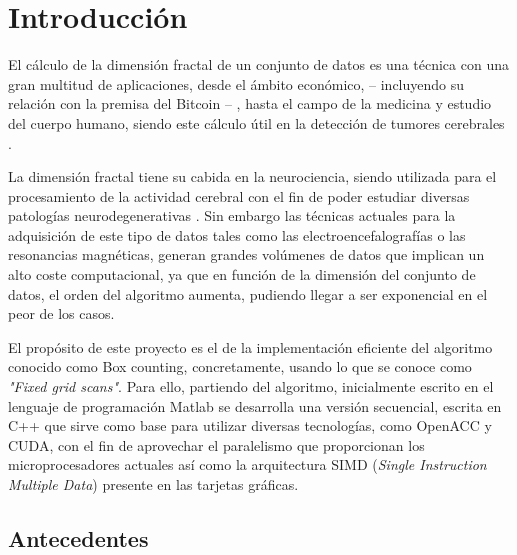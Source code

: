 \chapter{Introducción}


El cálculo de la dimensión fractal de un conjunto de datos es una técnica con una gran multitud de aplicaciones, desde el ámbito económico, -- incluyendo su relación con la premisa del Bitcoin --  {\cite{delfin2016fractal}}, hasta el campo de la medicina y estudio del cuerpo humano, siendo este cálculo útil en la detección de tumores cerebrales {\cite{iftekharuddin2009fractal}}.

La dimensión fractal tiene su cabida en la neurociencia, siendo utilizada para el procesamiento de la actividad cerebral con el fin de poder estudiar diversas patologías neurodegenerativas \cite{fernandez2001use}. Sin embargo las técnicas actuales para la adquisición de este tipo de datos tales como las electroencefalografías o las resonancias magnéticas, generan grandes volúmenes de datos que implican un alto coste computacional, ya que en función de la dimensión del conjunto de datos, el orden del algoritmo aumenta, pudiendo llegar a ser exponencial en el peor de los casos.

El propósito de este proyecto es el de la implementación eficiente del algoritmo conocido como Box counting, concretamente, usando lo que se conoce como \textit{"Fixed grid scans"}. Para ello, partiendo del algoritmo, inicialmente escrito en el lenguaje de programación Matlab se desarrolla una versión secuencial, escrita en C++ que sirve como base para utilizar diversas tecnologías, como OpenACC y CUDA, con el fin de aprovechar el paralelismo que proporcionan los microprocesadores actuales así como la arquitectura SIMD (\textit{Single Instruction Multiple Data}) presente en las tarjetas gráficas.


\section{Antecedentes}

